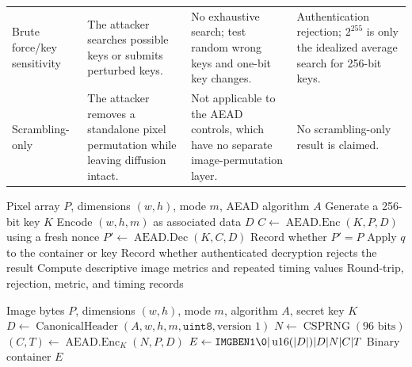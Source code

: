 \documentclass[letterpaper,journal]{IEEEtran}
\begin{document}
\begin{table}[!t]
\begin{tabular}{p{}p{}p{}p{}}
Brute force/key sensitivity & The attacker searches possible keys or submits perturbed keys. & No exhaustive search; test random wrong keys and one-bit key changes. & Authentication rejection; $2^{255}$ is only the idealized average search for 256-bit keys. \\
Scrambling-only & The attacker removes a standalone pixel permutation while leaving diffusion intact. & Not applicable to the AEAD controls, which have no separate image-permutation layer. & No scrambling-only result is claimed. \\
\bottomrule
\end{tabular}
\end{table}

\begin{algorithm}[t]
\caption{Control evaluation for one image and AEAD algorithm}
\label{alg:control}
\begin{algorithmic}[1]
\REQUIRE Pixel array $P$, dimensions $(w,h)$, mode $m$, AEAD algorithm $A$
\STATE Generate a 256-bit key $K$
\STATE Encode $(w,h,m)$ as associated data $D$
\STATE $C \leftarrow \operatorname{AEAD.Enc}(K,P,D)$ using a fresh nonce
\STATE $P' \leftarrow \operatorname{AEAD.Dec}(K,C,D)$
\STATE Record whether $P'=P$
  \STATE Apply $q$ to the container or key
  \STATE Record whether authenticated decryption rejects the result
\ENDFOR
\STATE Compute descriptive image metrics and repeated timing values
\RETURN Round-trip, rejection, metric, and timing records
\end{algorithmic}
\end{algorithm}

\begin{algorithm}[!t]
\caption{AEAD image encryption (sealing)}
\label{alg:seal}
\begin{algorithmic}[1]
\REQUIRE Image bytes $P$, dimensions $(w,h)$, mode $m$, algorithm $A$, secret key $K$
\STATE $D \leftarrow \operatorname{CanonicalHeader}(A,w,h,m,\texttt{uint8},\text{version }1)$
\STATE $N \leftarrow \operatorname{CSPRNG}(96\text{ bits})$
\STATE $(C,T) \leftarrow \operatorname{AEAD.Enc}_{K}(N,P,D)$
\STATE $E \leftarrow \texttt{IMGBEN1\textbackslash{}0} \\| \operatorname{u16}(|D|) \\| D \\| N \\| C \\| T$
\RETURN Binary container $E$
\end{algorithmic}
\end{algorithm}
\end{document}
